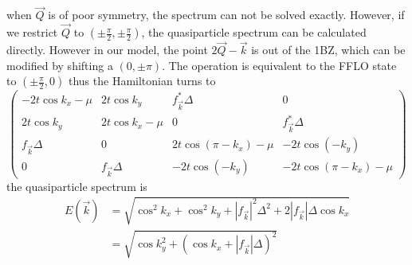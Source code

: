 \documentclass[12pt]{article}
\numberwithin{equation}{section}
\begin{document}
when $\vec{Q}$ is of poor symmetry, the spectrum can not be solved exactly. However, if we restrict $\vec{Q}$ to $(\pm\frac{\pi}{2},\pm\frac{\pi}{2})$, the quasiparticle spectrum can be calculated directly.
However in our model, the point $2\vec{Q}-\vec{k}$ is out of the 1BZ, which can be modified by shifting a $(0,\pm\pi)$. The operation is equivalent to the FFLO state to $(\pm\frac{\pi}{2},0)$ thus the Hamiltonian turns to
\begin{equation}
\left(\begin{array}{cccc}
	-2t\cos k_x-\mu & 2t\cos k_y & f^*_{\vec{k}}\Delta & 0 \\
	2t\cos k_y & 2t\cos k_x-\mu & 0 & f^*_{\vec{k}}\Delta \\
	f_{\vec{k}}\Delta & 0 & 2t\cos (\pi-k_x)-\mu & -2t\cos (-k_y) \\
	0 & f_{\vec{k}}\Delta & -2t\cos (-k_y) & -2t\cos (\pi-k_x)-\mu
	\end{array}\right)
\end{equation}
the quasiparticle spectrum is 
\begin{equation}
	\begin{aligned}
	E(\vec{k}) & = \sqrt{\cos^2 k_x+\cos^2 k_y+|f_{\vec{k}}|^2\Delta^2+2|f_{\vec{k}}|\Delta\cos k_x }\\ 
& = \sqrt{\cos k_y^2+(\cos k_x +|f_{\vec{k}}|\Delta)^2 }
	\end{aligned}
\end{equation}
\end{document}
